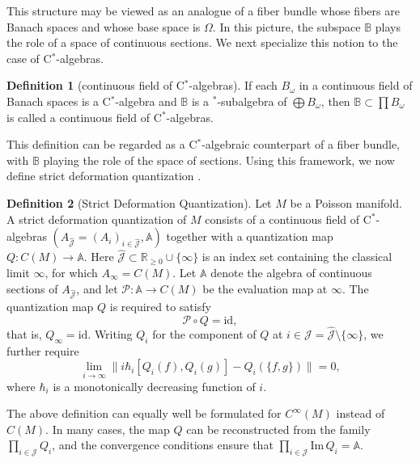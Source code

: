 \documentclass[12pt]{article}
\theoremstyle{definition} %
\newtheorem{definition}{Definition}
\theoremstyle{plain} %
\theoremstyle{remark} %
\theoremstyle{underline}
\begin{document}
This structure may be viewed as an analogue of a fiber bundle whose fibers are Banach spaces and whose base space is $\Omega$.
In this picture, the subspace $\mathbb{B}$ plays the role of a space of continuous sections.
We next specialize this notion to the case of C$^\ast$-algebras.

\begin{definition}[continuous field of C$^\ast$-algebras]
    If each $B_{\omega}$ in a continuous field of Banach spaces is a C$^\ast$-algebra and $\mathbb{B}$ is a $^\ast$-subalgebra of $\bigoplus B_{\omega}$, then $\mathbb{B}\subset \prod B_{\omega}$ is called a continuous field of C$^\ast$-algebras.
\end{definition}

This definition can be regarded as a C$^\ast$-algebraic counterpart of a fiber bundle, with $\mathbb{B}$ playing the role of the space of sections.
Using this framework, we now define strict deformation quantization \cite{rieffel1993deformation,hawkins1999quantization,hawkins2000geometric}.

\begin{definition}[Strict Deformation Quantization]
    Let $M$ be a Poisson manifold.
    A strict deformation quantization of $M$ consists of a continuous field of C$^\ast$-algebras $( A_{\hat{\mathcal{J}}}=(A_i)_{i\in\hat{\mathcal{J}}},\mathbb{A})$ together with a quantization map $Q:C(M)\to\mathbb{A}$.
    Here $\hat{\mathcal{J}}\subset \mathbb{R}_{\ge0}\cup\{\infty\}$ is an index set containing the classical limit $\infty$, for which $A_{\infty}=C(M)$.
    Let $\mathbb{A}$ denote the algebra of continuous sections of
    $ A_{\hat{\mathcal{J}}}$, and let $\mathcal{P}:\mathbb{A}\to C(M)$ be the evaluation map at $\infty$.
    The quantization map $Q$ is required to satisfy
    \[
        \mathcal{P}\circ Q = \mathrm{id},
    \]
    that is, $Q_{\infty}=\mathrm{id}$.
    Writing $Q_i$ for the component of $Q$ at $i\in\mathcal{J}
    =\hat{\mathcal{J}}\setminus\{\infty\}$, we further require
    \[
        \lim_{i\to\infty}\bigl\| i\hbar_i[Q_i(f),Q_i(g)]-Q_i(\{f,g\})\bigr\|=0,
    \]
    where $\hbar_i$ is a monotonically decreasing function of $i$.
\end{definition}

The above definition can equally well be formulated for $C^\infty(M)$ instead of $C(M)$.
In many cases, the map $Q$ can be reconstructed from the family $\prod_{i\in\mathcal{J}} Q_i$, and the convergence conditions ensure that $\prod_{i\in\mathcal{J}}\mathrm{Im}\,Q_i=\mathbb{A}$.
\end{document}
